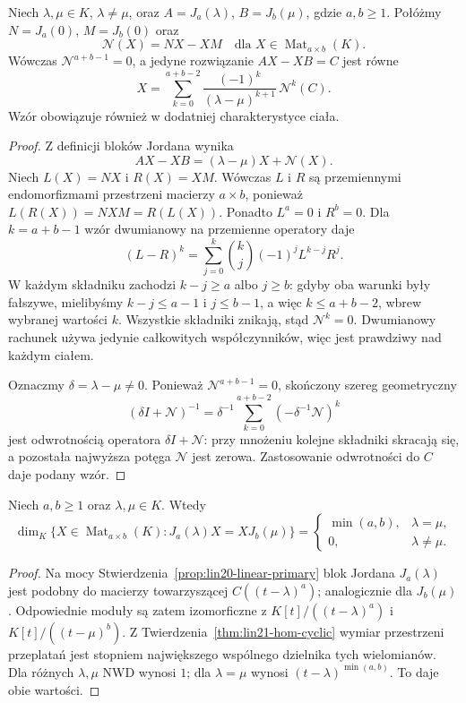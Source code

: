 \begin{stwierdzenie}
\label{prop:lin22-jordan-solve}
Niech \(\lambda,\mu\in K\),
\(\lambda\ne\mu\), oraz
\(A=J_a(\lambda)\),
\(B=J_b(\mu)\), gdzie \(a,b\ge1\).
Połóżmy
\(N=J_a(0)\), \(M=J_b(0)\)
oraz
\[
 \mathcal N(X)=NX-XM
 \quad\text{dla }X\in\operatorname{Mat}_{a\times b}(K).
\]
Wówczas \(\mathcal N^{a+b-1}=0\),
a jedyne rozwiązanie
\(AX-XB=C\) jest równe
\[
 X=\sum_{k=0}^{a+b-2}
 \frac{(-1)^k}{(\lambda-\mu)^{k+1}}\,
 \mathcal N^k(C).
\]
Wzór obowiązuje również
w dodatniej charakterystyce ciała.
\end{stwierdzenie}
\begin{proof}
Z definicji bloków Jordana
wynika
\[
 AX-XB=(\lambda-\mu)X+\mathcal N(X).
\]
Niech \(L(X)=NX\) i \(R(X)=XM\).
Wówczas \(L\) i \(R\) są
przemiennymi endomorfizmami przestrzeni
macierzy \(a\times b\), ponieważ
\(L(R(X))=NXM=R(L(X))\).
Ponadto \(L^a=0\) i \(R^b=0\).
Dla \(k=a+b-1\) wzór dwumianowy
na przemienne operatory daje
\[
 (L-R)^k
 =\sum_{j=0}^{k}\binom{k}{j}
       (-1)^jL^{k-j}R^j.
\]
W każdym składniku zachodzi
\(k-j\ge a\) albo \(j\ge b\):
gdyby oba warunki były fałszywe,
mielibyśmy
\(k-j\le a-1\) i \(j\le b-1\),
a więc \(k\le a+b-2\),
wbrew wybranej wartości \(k\).
Wszystkie składniki znikają,
stąd \(\mathcal N^k=0\).
Dwumianowy rachunek używa jedynie
całkowitych współczynników,
więc jest prawdziwy nad każdym ciałem.

Oznaczmy \(\delta=\lambda-\mu\ne0\).
Ponieważ \(\mathcal N^{a+b-1}=0\),
skończony szereg geometryczny
\[
 (\delta I+\mathcal N)^{-1}
 =\delta^{-1}\sum_{k=0}^{a+b-2}
           (-\delta^{-1}\mathcal N)^k
\]
jest odwrotnością operatora
\(\delta I+\mathcal N\):
przy mnożeniu kolejne składniki
skracają się, a pozostała
najwyższa potęga \(\mathcal N\)
jest zerowa.
Zastosowanie odwrotności do \(C\)
daje podany wzór.
\end{proof}

\begin{stwierdzenie}
\label{prop:lin22-jordan-hom}
Niech \(a,b\ge1\) oraz
\(\lambda,\mu\in K\).
Wtedy
\[
 \dim_K\{X\in\operatorname{Mat}_{a\times b}(K):
          J_a(\lambda)X=XJ_b(\mu)\}
 =\begin{cases}
  \min(a,b),&\lambda=\mu,\\
  0,&\lambda\ne\mu.
 \end{cases}
\]
\end{stwierdzenie}
\begin{proof}
Na mocy
Stwierdzenia~\ref{prop:lin20-linear-primary}
blok Jordana \(J_a(\lambda)\)
jest podobny do macierzy
towarzyszącej
\(C((t-\lambda)^a)\);
analogicznie dla \(J_b(\mu)\).
Odpowiednie moduły są zatem
izomorficzne z
\(K[t]/((t-\lambda)^a)\)
i \(K[t]/((t-\mu)^b)\).
Z Twierdzenia~\ref{thm:lin21-hom-cyclic}
wymiar przestrzeni przeplatań
jest stopniem największego
wspólnego dzielnika tych wielomianów.
Dla różnych \(\lambda,\mu\)
NWD wynosi \(1\);
dla \(\lambda=\mu\)
wynosi \((t-\lambda)^{\min(a,b)}\).
To daje obie wartości.
\end{proof}

